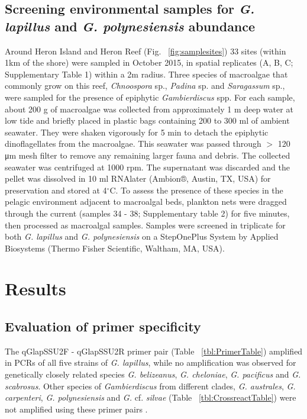 \documentclass[12pt]{article}
\begin{document}
\subsection*{Screening environmental samples for \emph{G. lapillus} and \emph{G. polynesiensis} abundance}
Around Heron Island and Heron Reef (Fig. ~\ref{fig:samplesites}) 33 sites (within 1km of the shore) were sampled in October 2015, in spatial replicates (A, B, C; Supplementary Table 1) within a 2m radius. Three species of macroalgae that commonly grow on this reef, \textit{Chnoospora} sp., \textit{Padina} sp. and \textit{Saragassum} sp., were sampled for the presence of epiphytic \emph{Gambierdiscus} spp. For each sample, about 200 g of macroalgae was collected from approximately 1 m deep water at low tide and briefly placed in plastic bags containing 200 to 300 ml of ambient seawater. They were shaken vigorously for 5 min to detach the epiphytic dinoflagellates from the macroalgae. This seawater was passed through $>$ 120 μm mesh filter to remove any remaining larger fauna and debris. The collected seawater was centrifuged at 1000 rpm. The supernatant was discarded and the pellet was dissolved in 10 ml RNAlater (Ambion®, Austin, TX, USA) for preservation and stored at 4$^{\circ}$C.
To assess the presence of these species in the pelagic environment adjacent to macroalgal beds, plankton nets were dragged through the current (samples 34 - 38; Supplementary table 2) for five minutes, then processed as macroalgal samples.
Samples were screened in triplicate for both \emph{G. lapillus} and \emph{G. polynesiensis} on a StepOnePlus System by Applied Biosystems (Thermo Fisher Scientific, Waltham, MA, USA).



\newpage
\section*{Results}
\subsection*{Evaluation of primer specificity}
The qGlapSSU2F - qGlapSSU2R primer pair (Table ~\ref{tbl:PrimerTable}) amplified in PCRs of all five strains of \emph{G. lapillus}, while no amplification was observed for genetically closely related species \emph{G. belizeanus}, \emph{G. cheloniae}, \emph{G. pacificus} and \emph{G. scabrosus}. Other species of \emph{Gambierdiscus} from different clades, \emph{G. australes}, \emph{G. carpenteri}, \emph{G. polynesiensis} and \emph{G.} cf. \emph{silvae} (Table ~\ref{tbl:CrossreactTable}) were not amplified using these primer pairs \citep{smith2016new,kretzschmar2016characterization}.
\end{document}
